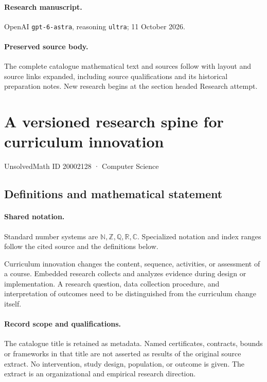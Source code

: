 \documentclass[11pt]{article}
\begin{document}
\paragraph{Research manuscript.} OpenAI \texttt{gpt-6-astra}, reasoning \texttt{ultra}; 11 October 2026.
\paragraph{Preserved source body.} The complete catalogue mathematical text and sources follow with layout and source links expanded, including source qualifications and its historical preparation notes. New research begins at the section headed Research attempt.

\section{A versioned research spine for curriculum innovation}\label{20002128}
{\small UnsolvedMath ID 20002128 · Computer Science}
\subsection{Definitions and mathematical statement}

\paragraph{Shared notation.}Standard number systems are $\mathbb N,\mathbb Z,\mathbb Q,\mathbb R,\mathbb C$. Specialized notation and index ranges follow the cited source and the definitions below.


Curriculum innovation changes the content, sequence, activities, or assessment of a course. Embedded research collects and analyzes evidence during design or implementation. A research question, data collection procedure, and interpretation of outcomes need to be distinguished from the curriculum change itself.
\paragraph{Record scope and qualifications.}
The catalogue title is retained as metadata. Named certificates, contracts, bounds or frameworks in that title are not asserted as results of the original source extract.
No intervention, study design, population, or outcome is given. The extract is an organizational and empirical research direction.
\end{document}
